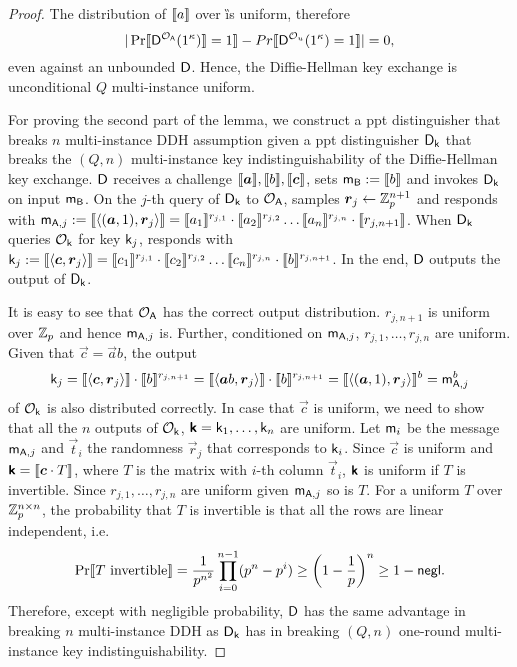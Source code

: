 \begin{proof}
The distribution of $\llbracket a\rrbracket$ over \G is uniform, therefore 
$$
|\Pr\llbracket \mathsf D^{\mathcal{O}_{\mathsf{A}}}(1^{\kappa})\rrbracket=1\rrbracket-Pr\llbracket \mathsf D^{\mathcal{O}_{u}}(1^{\kappa})=1\rrbracket|=0,
$$
even against an unbounded $\mathsf D$. Hence, the Diffie-Hellman key exchange is unconditional $Q$ multi-instance uniform.

For proving the second part of the lemma, we construct a ppt distinguisher \D that breaks $n$ multi-instance DDH assumption given a ppt distinguisher $\mathsf D_\mathsf{k}$ that breaks the $(Q,n)$ multi-instance key indistinguishability of the Diffie-Hellman key exchange. $\mathsf D$ receives a challenge $\lb \vec{a}\rb,\lb b\rb,\lb \vec{c}\rb$, sets $\mathsf{m}_{\mathsf{B}}:=\llbracket b\rrbracket$ and invokes $\mathsf D_{\mathsf{k}}$ on input $\mathsf{m}_{\mathsf{B}}$. On the $j$-th query of $\mathsf D_{\mathsf{k}}$ to $\mathcal{O}_{\mathsf{A}}$, \D samples $\vec{r}_j\leftarrow\Z_p^{n+1}$ and responds with $\mes_{\A,j}:=\lb \langle (\vec{a},1),\vec{r}_j\rangle\rb=\lb a_1\rb^{r_{j,1}}\cdot\lb a_2\rb^{r_{j,2}}\ldots\lb a_n\rb^{r_{j,n}}\cdot\lb r_{j,n+1}\rb$. When $\mathsf D_{\mathsf{k}}$ queries $\mathcal{O}_{\mathsf{k}}$ for key $\mathsf{k}_j$, \D responds with $\key_j:=\lb \langle\vec{c},\vec{r}_j\rangle\rb=\lb c_1\rb^{r_{j,1}}\cdot\lb c_2\rb^{r_{j,2}}\ldots\lb c_n\rb^{r_{j,n}}\cdot\lb b\rb^{r_{j,n+1}}$. In the end, $\mathsf D$ outputs the output of $\mathsf D_{\mathsf{k}}$.

It is easy to see that $\mathcal{O}_{\mathsf{A}}$ has the correct output distribution. $r_{j,n+1}$ is uniform over $\mathbb Z_p$ and hence $\mathsf{m}_{\mathsf{A},j}$ is. Further, conditioned on $\mathsf{m}_{\mathsf{A},j}$, $r_{j,1},\ldots,r_{j,n}$ are uniform. Given that $\vec{c}=\vec{a}b$, the output
$$
\key_j=\lb \langle\vec{c},\vec{r}_j\rangle\rb\cdot\lb b\rb^{r_{j,n+1}}=\lb \langle\vec{a}b,\vec{r}_j\rangle\rb\cdot\lb b\rb^{r_{j,n+1}}=\lb \langle(\vec{a},1),\vec{r}_j\rangle\rb^b=\mes_{\A,j}^b
$$
of $\mathcal{O}_{\mathsf{k}}$ is also distributed correctly. In case that $\vec{c}$ is uniform, we need to show that all the $n$ outputs of $\mathcal{O}_{\mathsf{k}}$, $\vec{\key}=\key_1,\ldots,\key_n$ are uniform. Let $\mathsf{m}_i$ be the message $\mathsf{m}_{\mathsf{A},j}$ and $\vec{t}_i$ the randomness $\vec{r}_j$ that corresponds to $\mathsf{k}_i$. Since $\vec{c}$ is uniform and $\vec{\key}=\lb \vec{c}\cdot T\rb$, where $T$ is the matrix with $i$-th column $\vec{t}_i$, $\vec{\key}$ is uniform if $T$ is invertible. Since $r_{j,1},\ldots,r_{j,n}$ are uniform given $\mathsf{m}_{\mathsf{A},j}$ so is $T$. For a uniform $T$ over $\mathbb Z_p^{n\times n}$, the probability that $T$ is invertible is that all the rows are linear independent, i.e. 
$$
\Pr\llbracket T\text{ invertible}\rrbracket= \frac{1}{p^{n^2}}\prod_{i=0}^{n-1}(p^n-p^i)\geq\left(1-\frac{1}{p}\right)^n\geq 1-\mathsf{negl}.
$$ 
Therefore, except with negligible probability, $\mathsf D$ has the same advantage in breaking $n$ multi-instance DDH as $\mathsf D_{\mathsf{k}}$ has in breaking $(Q,n)$ one-round multi-instance key indistinguishability.
\pe
\end{proof}

